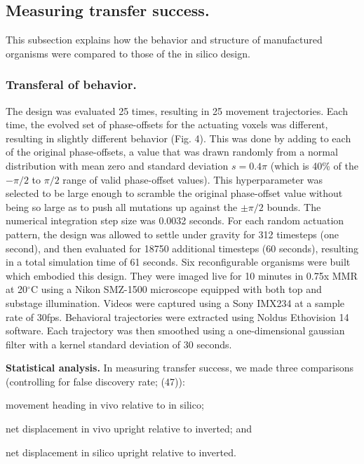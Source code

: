\subsection*{Measuring transfer success.}

This subsection explains how the behavior and structure of manufactured organisms were compared to those of the in silico design.

\subsubsection*{Transferal of behavior.}


The design was evaluated 25 times, resulting in 25 movement trajectories. Each time, the evolved set of phase-offsets for the actuating voxels was different, resulting in slightly different behavior (Fig. 4). This was done by adding to each of the original phase-offsets, a value that was drawn randomly from a normal distribution with mean zero and standard deviation {$s = 0.4\pi$} (which is 40\% of the {$-\pi/2$} to {$\pi/2$} range of valid phase-offset values). 
This hyperparameter was selected to be large enough to scramble the original phase-offset value without being so large as to push all mutations up against the {$\pm\pi/2$} bounds.
The numerical integration step size was 0.0032 seconds. For each random actuation pattern, the design was allowed to settle under gravity for 312 timesteps (one second), and then evaluated for 18750 additional timesteps (60 seconds), resulting in a total simulation time of 61 seconds. 
Six reconfigurable organisms were built which embodied this design. They were imaged live for 10 minutes in 0.75x MMR at 20{$^{\circ}$}C using a Nikon SMZ-1500 microscope equipped with both top and substage illumination. Videos were captured using a Sony IMX234 at a sample rate of 30fps. Behavioral trajectories were extracted using Noldus Ethovision 14 software. Each trajectory was then smoothed using a one-dimensional gaussian filter with a kernel standard deviation of 30 seconds.

\textbf{Statistical analysis.}  
In measuring transfer success, we made three comparisons (controlling for false discovery rate; (47)):

movement heading in vivo relative to in silico;

net displacement in vivo upright relative to inverted; and

net displacement in silico upright relative to inverted. 

